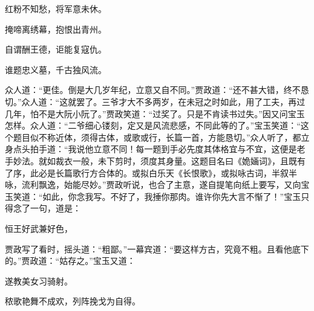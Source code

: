\begin{poem}
    \begin{pl}红粉不知愁，将军意未休。\end{pl}

    \begin{pl}掩啼离绣幕，抱恨出青州。\end{pl}

    \begin{pl}自谓酬王德，讵能复寇仇。\end{pl}

    \begin{pl}谁题忠义墓，千古独风流。\end{pl}


\end{poem}


\begin{parag}
    众人道：“更佳。倒是大几岁年纪，立意又自不同。”贾政道：“还不甚大错，终不恳切。”众人道：“这就罢了。三爷才大不多两岁，在未冠之时如此，用了工夫，再过几年，怕不是大阮小阮了。”贾政笑道：“过奖了。只是不肯读书过失。”因又问宝玉怎样。众人道：“二爷细心镂刻，定又是风流悲感，不同此等的了。”宝玉笑道：“这个题目似不称近体，须得古体，或歌或行，长篇一首，方能恳切。”众人听了，都立身点头拍手道：“我说他立意不同！每一题到手必先度其体格宜与不宜，这便是老手妙法。就如裁衣一般，未下剪时，须度其身量。这题目名曰《姽婳词》，且既有了序，此必是长篇歌行方合体的。或拟白乐天《长恨歌》，或拟咏古词，半叙半咏，流利飘逸，始能尽妙。”贾政听说，也合了主意，遂自提笔向纸上要写，又向宝玉笑道：“如此，你念我写。不好了，我捶你那肉。谁许你先大言不惭了！”宝玉只得念了一句，道是：
\end{parag}


\begin{poem}
    \begin{pl}恒王好武兼好色，\end{pl}
\end{poem}


\begin{parag}
    贾政写了看时，摇头道：“粗鄙。”一幕宾道：“要这样方古，究竟不粗。且看他底下的。”贾政道：“姑存之。”宝玉又道：
\end{parag}


\begin{poem}
    \begin{pl}遂教美女习骑射。\end{pl}

    \begin{pl}秾歌艳舞不成欢，列阵挽戈为自得。\end{pl}


\end{poem}


